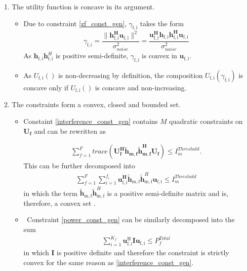 \documentclass[12pt,a4paper]{report}
\begin{document}
\begin{enumerate}
\item The utility function is concave in its argument.
\begin{itemize}
\item 
Due to constraint \eqref{zf_const_gen}, $\gamma_{\mathrm{f,i}}$ takes the form
	\begin{equation}\label{zf_snr}
	\gamma_{\mathrm{f,i}} = \frac{\|\mathbf{h^H_{\mathrm{f,i}}u_{\mathrm{f,i}}}\|^2}
	{\sigma^2_{noise}  
	}
	= 
	\frac{\mathbf{u^H_{\mathrm{f,i}}h_{\mathrm{f,i}}h^H_{\mathrm{f,i}}u_{\mathrm{f,i}}}}
	{\sigma^2_{noise}  
	}
	\end{equation}
	As $\mathbf{h}_{\mathrm{f,i}}\mathbf{h}^H_{\mathrm{f,i}}$ is positive semi-definite, $\gamma_{\mathrm{f,i}}$ is convex in ${\mathbf{u}_{\mathrm{f,i}}}$. 
\item
As $U_{\mathrm{f,i}}() $ is non-decreasing by definition, the composition $U_{\mathrm{f,i}}(\gamma_{\mathrm{f,i}}) $ is concave only if $U_{\mathrm{f,i}}() $ is concave and non-increasing.
\end{itemize}

\item
The constraints form a convex, closed and bounded set. 

\begin{itemize}

\item
	Constaint \eqref{interference_const_gen} contains $M$ quadratic constraints on $\mathbf{U_f}$ and 
	can be rewritten as 

\begin{gather*}
	\sum_{f=1}^F
	trace(\mathbf{U_f^H} \mathbf{\tilde{h}_{m,f}} \mathbf{\tilde{h}_{m,f}^H} \mathbf{U_f} )\leq 
	I^{Threshold}_{m}.
\end{gather*}
This can be further decomposed into  
	\begin{gather*}
	\sum_{f=1}^F
	\sum_{i=1}^{f_i}
	\mathbf{u_{\mathrm{f,i}}^H}\mathbf{\tilde{h}_{\mathrm{m,f}}} \mathbf{\tilde{h}}_{\mathrm{m,f}}^H
	\mathbf{u_{\mathrm{f,i}}} \leq I^{Threshold}_{m}
	\end{gather*}
in which the term $ \mathbf{\tilde{h}_{\mathrm{m,f}}} \mathbf{\tilde{h}}_{\mathrm{m,f}}^H$ is  a positive semi-definite matrix and is, therefore, a convex set 
\cite[p.8,9]{BoV:04}. 


\item \
	Constraint \eqref{power_const_gen} can be similarly decomposed into the sum
	\begin{gather*}
		\sum_{i=1}^{K_f}\mathbf{u_{\mathrm{f,i}}^{\mathrm{H}}} \mathbf{I} 		
		\mathbf{u_{\mathrm{f,i}}} \leq  P^{Total}_{f}
	\end{gather*}
	in which $\mathbf{I}$ is positive definite and 			
	therefore the constraint is strictly convex for the same 		
	reason as \eqref{interference_const_gen}.
\end{itemize}


\end{enumerate}
\end{document}
